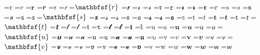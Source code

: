 \documentclass{article}
\begin{document}
=\hbox{$\mathrm{r}$}
=\hbox{$\mathit{r}$}
=\hbox{$\mathbf{r}$}
=\hbox{$\mathbfit{r}$}
=\hbox{$\mathsf{r}$}
=\hbox{$\mathsfit{r}$}
=\hbox{$\mathbfsf{r}$}
=\hbox{$\mathbfsfit{r}$}
=\hbox{$\mathcal{r}$}
=\hbox{$\mathscr{r}$}
=\hbox{$\mathfrak{r}$}
=\hbox{$\mathtt{r}$}
=\hbox{$\mathbfcal{r}$}
=\hbox{$\mathbfscr{r}$}
=\hbox{$\mathbffrak{r}$}
=\hbox{$\mathbb{r}$}
=\hbox{$\mathrm{s}$}
=\hbox{$\mathit{s}$}
=\hbox{$\mathbf{s}$}
=\hbox{$\mathbfit{s}$}
=\hbox{$\mathsf{s}$}
=\hbox{$\mathsfit{s}$}
=\hbox{$\mathbfsf{s}$}
=\hbox{$\mathbfsfit{s}$}
=\hbox{$\mathcal{s}$}
=\hbox{$\mathscr{s}$}
=\hbox{$\mathfrak{s}$}
=\hbox{$\mathtt{s}$}
=\hbox{$\mathbfcal{s}$}
=\hbox{$\mathbfscr{s}$}
=\hbox{$\mathbffrak{s}$}
=\hbox{$\mathbb{s}$}
=\hbox{$\mathrm{t}$}
=\hbox{$\mathit{t}$}
=\hbox{$\mathbf{t}$}
=\hbox{$\mathbfit{t}$}
=\hbox{$\mathsf{t}$}
=\hbox{$\mathsfit{t}$}
=\hbox{$\mathbfsf{t}$}
=\hbox{$\mathbfsfit{t}$}
=\hbox{$\mathcal{t}$}
=\hbox{$\mathscr{t}$}
=\hbox{$\mathfrak{t}$}
=\hbox{$\mathtt{t}$}
=\hbox{$\mathbfcal{t}$}
=\hbox{$\mathbfscr{t}$}
=\hbox{$\mathbffrak{t}$}
=\hbox{$\mathbb{t}$}
=\hbox{$\mathrm{u}$}
=\hbox{$\mathit{u}$}
=\hbox{$\mathbf{u}$}
=\hbox{$\mathbfit{u}$}
=\hbox{$\mathsf{u}$}
=\hbox{$\mathsfit{u}$}
=\hbox{$\mathbfsf{u}$}
=\hbox{$\mathbfsfit{u}$}
=\hbox{$\mathcal{u}$}
=\hbox{$\mathscr{u}$}
=\hbox{$\mathfrak{u}$}
=\hbox{$\mathtt{u}$}
=\hbox{$\mathbfcal{u}$}
=\hbox{$\mathbfscr{u}$}
=\hbox{$\mathbffrak{u}$}
=\hbox{$\mathbb{u}$}
=\hbox{$\mathrm{v}$}
=\hbox{$\mathit{v}$}
=\hbox{$\mathbf{v}$}
=\hbox{$\mathbfit{v}$}
=\hbox{$\mathsf{v}$}
=\hbox{$\mathsfit{v}$}
=\hbox{$\mathbfsf{v}$}
=\hbox{$\mathbfsfit{v}$}
=\hbox{$\mathcal{v}$}
=\hbox{$\mathscr{v}$}
=\hbox{$\mathfrak{v}$}
=\hbox{$\mathtt{v}$}
=\hbox{$\mathbfcal{v}$}
=\hbox{$\mathbfscr{v}$}
=\hbox{$\mathbffrak{v}$}
=\hbox{$\mathbb{v}$}
=\hbox{$\mathrm{w}$}
=\hbox{$\mathit{w}$}
=\hbox{$\mathbf{w}$}
=\hbox{$\mathbfit{w}$}
=\hbox{$\mathsf{w}$}
=\hbox{$\mathsfit{w}$}
\end{document}
